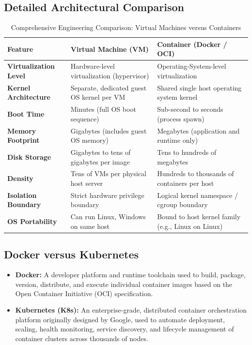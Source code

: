 \subsection{Detailed Architectural Comparison}
\begin{table}[htbp]
\centering
\small
\caption{Comprehensive Engineering Comparison: Virtual Machines versus Containers}
\label{tab:vms_vs_containers}
\begin{tabularx}{\textwidth}{p{3.2cm}XX}
\toprule
\textbf{Feature} & \textbf{Virtual Machine (VM)} & \textbf{Container (Docker / OCI)} \\
\midrule
\textbf{Virtualization Level} & Hardware-level virtualization (hypervisor) & Operating-System-level virtualization \\
\textbf{Kernel Architecture} & Separate, dedicated guest OS kernel per VM & Shared single host operating system kernel \\
\textbf{Boot Time} & Minutes (full OS boot sequence) & Sub-second to seconds (process spawn) \\
\textbf{Memory Footprint} & Gigabytes (includes guest OS memory) & Megabytes (application and runtime only) \\
\textbf{Disk Storage} & Gigabytes to tens of gigabytes per image & Tens to hundreds of megabytes \\
\textbf{Density} & Tens of VMs per physical host server & Hundreds to thousands of containers per host \\
\textbf{Isolation Boundary} & Strict hardware privilege boundary & Logical kernel namespace / cgroup boundary \\
\textbf{OS Portability} & Can run Linux, Windows on same host & Bound to host kernel family (e.g., Linux on Linux) \\
\bottomrule
\end{tabularx}
\end{table}

\subsection{Docker versus Kubernetes}
\begin{itemize}
    \item \textbf{Docker:} A developer platform and runtime toolchain used to build, package, version, distribute, and execute individual container images based on the Open Container Initiative (OCI) specification.
    \item \textbf{Kubernetes (K8s):} An enterprise-grade, distributed container orchestration platform originally designed by Google, used to automate deployment, scaling, health monitoring, service discovery, and lifecycle management of container clusters across thousands of nodes.
\end{itemize}

